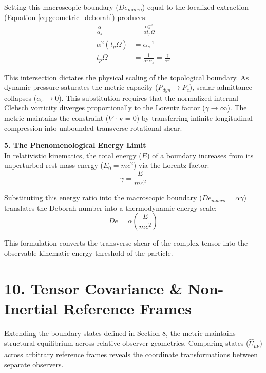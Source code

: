 Setting this macroscopic boundary ($De_{macro}$) equal to the localized extraction (Equation \ref{eq:geometric_deborah}) produces: 
\begin{align}
    \frac{\alpha}{\alpha_s} &= \frac{\alpha_s^{-2}}{\alpha t_p \Omega} \nonumber \\
    \alpha^2 (t_p \Omega) &= \alpha_s^{-1} \nonumber \\
    t_p \Omega &= \frac{1}{\alpha^2 \alpha_s} = \frac{\gamma}{\alpha^2}
\end{align}

This intersection dictates the physical scaling of the topological boundary. As dynamic pressure saturates the metric capacity ($P_{dyn} \to P_c$), scalar admittance collapses ($\alpha_s \to 0$). This substitution requires that the normalized internal Clebsch vorticity diverges proportionally to the Lorentz factor ($\gamma \to \infty$). The metric maintains the constraint ($\nabla \cdot \mathbf{v} = 0$) by transferring infinite longitudinal compression into unbounded transverse rotational shear. 

\textbf{5. The Phenomenological Energy Limit} \\ 
In relativistic kinematics, the total energy ($E$) of a boundary increases from its unperturbed rest mass energy ($E_0 = m c^2$) via the Lorentz factor:
\begin{equation}
    \gamma = \frac{E}{m c^2}
\end{equation}

Substituting this energy ratio into the macroscopic boundary ($De_{macro} = \alpha \gamma$) translates the Deborah number into a thermodynamic energy scale: 
\begin{equation}
    De = \alpha \left( \frac{E}{m c^2} \right)
\end{equation}

This formulation converts the transverse shear of the complex tensor into the observable kinematic energy threshold of the particle. 

\section*{10. Tensor Covariance \& Non-Inertial Reference Frames}
Extending the boundary states defined in Section 8, the metric maintains structural equilibrium across relative observer geometries. Comparing states ($\hat{U}_{\mu\nu}$) across arbitrary reference frames reveals the coordinate transformations between separate observers. 

